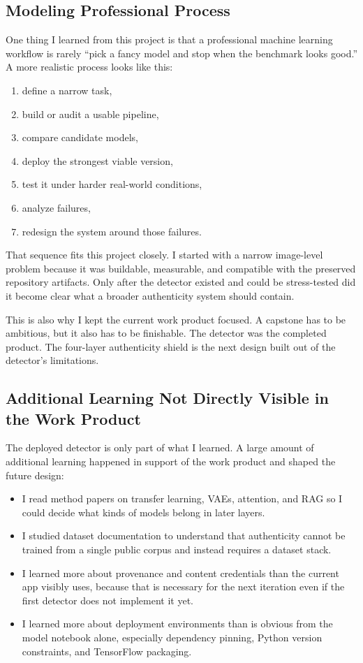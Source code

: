 \documentclass[11pt]{article}
\begin{document}
\subsection{Modeling Professional Process}
One thing I learned from this project is that a professional machine learning workflow is rarely ``pick a fancy model and stop when the benchmark looks good.'' A more realistic process looks like this:
\begin{enumerate}[leftmargin=1.5em]
    \item define a narrow task,
    \item build or audit a usable pipeline,
    \item compare candidate models,
    \item deploy the strongest viable version,
    \item test it under harder real-world conditions,
    \item analyze failures,
    \item redesign the system around those failures.
\end{enumerate}

That sequence fits this project closely. I started with a narrow image-level problem because it was buildable, measurable, and compatible with the preserved repository artifacts. Only after the detector existed and could be stress-tested did it become clear what a broader authenticity system should contain.

This is also why I kept the current work product focused. A capstone has to be ambitious, but it also has to be finishable. The detector was the completed product. The four-layer authenticity shield is the next design built out of the detector's limitations.

\subsection{Additional Learning Not Directly Visible in the Work Product}
The deployed detector is only part of what I learned. A large amount of additional learning happened in support of the work product and shaped the future design:
\begin{itemize}[leftmargin=1.5em]
    \item I read method papers on transfer learning, VAEs, attention, and RAG so I could decide what kinds of models belong in later layers.
    \item I studied dataset documentation to understand that authenticity cannot be trained from a single public corpus and instead requires a dataset stack.
    \item I learned more about provenance and content credentials than the current app visibly uses, because that is necessary for the next iteration even if the first detector does not implement it yet.
    \item I learned more about deployment environments than is obvious from the model notebook alone, especially dependency pinning, Python version constraints, and TensorFlow packaging.
\end{itemize}
\end{document}
